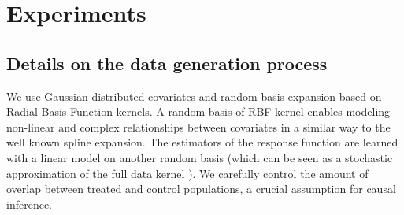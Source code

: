 \documentclass[10pt]{article}
\begin{document}
\section{Experiments}

\subsection{Details on the data generation process}
\label{apd:experiments:generation}

We use Gaussian-distributed covariates and random basis expansion based on
Radial Basis Function kernels. A random basis of RBF kernel enables modeling
non-linear and complex relationships between covariates in a similar way to the
well known spline expansion. The estimators of the response function are learned
with a linear model on another random basis (which can be seen as a stochastic
approximation of the full data kernel \cite{rahimi_random_2008}). We
carefully control the amount of overlap between treated and control populations,
a crucial assumption for causal inference.
\end{document}
